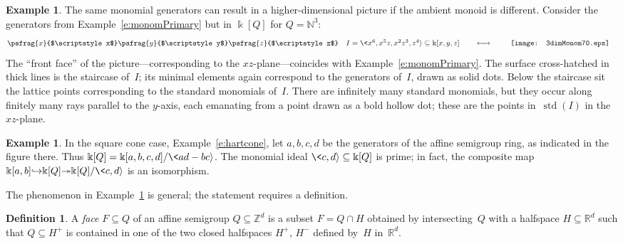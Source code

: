 \documentclass[12pt]{amsart}
\numberwithin{equation}{section}
\theoremstyle{definition}
\newtheorem{defn}[thm]{Definition}
\newtheorem{example}[thm]{Example}
\begin{document}
\begin{example}\label{e:monomPrimary'}
The same monomial generators can result in a higher-dimensional
picture if the ambient monoid is different.  Consider the generators
from Example~\ref{e:monomPrimary} but in ${\Bbbk}[Q]$ for $Q = {\mathbb{N}}^3$:
$$\psfrag{x}{$\scriptstyle x$}
\psfrag{y}{$\scriptstyle y$}
\psfrag{z}{$\scriptstyle z$}
\begin{array}{cc}
  \begin{array}{c}
  I = \<x^6, x^5z, x^2z^3,z^4{\rangle} \subseteq {\Bbbk}[x,y,z]
  \qquad\longleftrightarrow\ \
  \end{array}
&
  \begin{array}{c}\texttt{[image: 3dimMonom70.eps]}\end{array}
\end{array}
$$
The ``front face'' of the picture---corresponding to the
$xz$-plane---coincides with Example~\ref{e:monomPrimary}.  The surface
cross-hatched in thick lines is the staircase of~$I$; its minimal
elements again correspond to the generators of~$I$, drawn as solid
dots.  Below the staircase sit the lattice points corresponding to the
standard monomials of~$I$.  There are infinitely many standard
monomials, but they occur along finitely many rays parallel to the
$y$-axis, each emanating from a point drawn as a bold hollow dot;
these are the points in~$\operatorname{std}(I)$ in the $xz$-plane.
\end{example}

\begin{example}\label{e:face}
In the square cone case, Example~\ref{e:hartcone}, let $a,b,c,d$ be
the generators of the affine semigroup ring, as indicated in the
figure there.  Thus ${\Bbbk}[Q] = {\Bbbk}[a,b,c,d]/\<ad-bc{\rangle}$.  The monomial
ideal $\<c,d{\rangle} \subseteq {\Bbbk}[Q]$ is prime; in fact, the composite map
${\Bbbk}[a,b] {\hookrightarrow} {\Bbbk}[Q] {\twoheadrightarrow} {\Bbbk}[Q]/\<c,d{\rangle}$ is an isomorphism.
\end{example}

The phenomenon in Example~\ref{e:face} is general; the statement
requires a definition.

\begin{defn}
A \emph{face} $F \subseteq Q$ of an affine semigroup $Q \subseteq
{\mathbb{Z}}^d$ is a subset $F = Q \cap H$ obtained by intersecting~$Q$ with a
halfspace $H \subseteq {\mathbb{R}}^d$ such that $Q \subseteq H^+$ is contained
in one of the two closed halfspaces $H^+$, $H^-$ defined by~$H$
in~${\mathbb{R}}^d$.
\end{defn}
\end{document}
